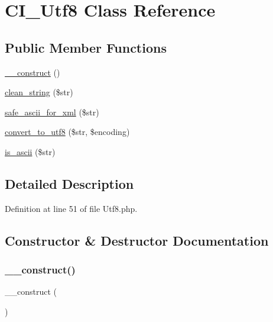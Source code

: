 \hypertarget{class_c_i___utf8}{}\section{C\+I\+\_\+\+Utf8 Class Reference}
\label{class_c_i___utf8}
\subsection*{Public Member Functions}
\begin{DoxyCompactItemize}
\item 
\mbox{\hyperlink{class_c_i___utf8_a095c5d389db211932136b53f25f39685}{\+\_\+\+\_\+construct}} ()
\item 
\mbox{\hyperlink{class_c_i___utf8_af9fc6214803042dd0b46d6ac5bdb4b7b}{clean\+\_\+string}} (\$str)
\item 
\mbox{\hyperlink{class_c_i___utf8_a10d712b507a87fd841f134143eaedb8e}{safe\+\_\+ascii\+\_\+for\+\_\+xml}} (\$str)
\item 
\mbox{\hyperlink{class_c_i___utf8_a7f6a8b9f00d7d11b23abcadfc91e9583}{convert\+\_\+to\+\_\+utf8}} (\$str, \$encoding)
\item 
\mbox{\hyperlink{class_c_i___utf8_a8676dd1e98c759c6ef90fe6a9ba4e119}{is\+\_\+ascii}} (\$str)
\end{DoxyCompactItemize}


\subsection{Detailed Description}


Definition at line 51 of file Utf8.\+php.



\subsection{Constructor \& Destructor Documentation}
\mbox{\label{class_c_i___utf8_a095c5d389db211932136b53f25f39685}} 
\subsubsection{\texorpdfstring{\_\_construct()}{\_\_construct()}}
{\footnotesize\ttfamily \+\_\+\+\_\+construct (\begin{DoxyParamCaption}{ }\end{DoxyParamCaption})}

